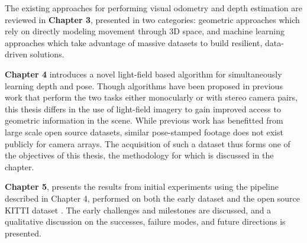 The existing approaches for performing visual odometry and depth estimation are reviewed in \textbf{Chapter 3}, presented in two categories: geometric approaches which rely on directly modeling movement through 3D space, and machine learning approaches which take advantage of massive datasets to build resilient, data-driven solutions.

\textbf{Chapter 4} introduces a novel light-field based algorithm for simultaneously learning depth and pose. Though algorithms have been proposed in previous work that perform the two tasks either monocularly or with stereo camera pairs, this thesis differs in the use of light-field imagery to gain improved access to geometric information in the scene. While previous work has benefitted from large scale open source datasets, similar pose-stamped footage does not exist publicly for camera arrays. The acquisition of such a dataset thus forms one of the objectives of this thesis, the methodology for which is discussed in the chapter.

\textbf{Chapter 5}, presents the results from initial experiments using the pipeline described in Chapter 4, performed on both the early dataset and the open source KITTI dataset \cite{dataset-kitti}. The early challenges and milestones are discussed, and a qualitative discussion on the successes, failure modes, and future directions is presented. 


